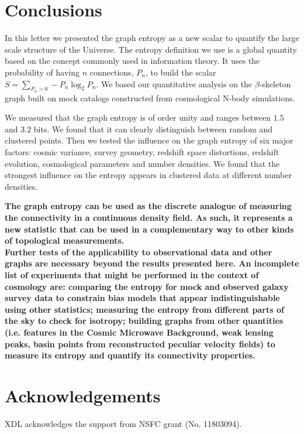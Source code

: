 \documentclass[fleqn,usenatbib]{mnras}
\begin{document}
\section{Conclusions}

In this letter we presented the graph entropy as a new scalar to 
quantify the large scale structure of the Universe.
The entropy definition we use is a global quantity based on 
the concept commonly used in information theory.
It uses the probability of having $n$ connections, $P_n$, to build the 
scalar $S=\sum_{P_n>0} -P_n  \log_2 P_n$. 
We based our quantitative analysis on the $\beta$-skeleton graph 
built on mock catalogs constructed from cosmological N-body simulations.

We measured that the graph entropy is of order unity and ranges 
between $1.5$ and $3.2$ bits.
We found that it can clearly distinguish between random and clustered points.
Then we tested the influence on the graph entropy of six major factors: 
cosmic variance, survey geometry, redshift space distortions, redshift evolution, cosmological parameters and number densities.
We found that the strongest influence on the entropy appears in
clustered data at different number densities.

\textbf{The graph entropy can be used as the discrete analogue
  of measuring the connectivity in a continuous density field.
  As such, it represents a new statistic that can be used in a complementary way to other kinds of topological measurements.\\
 \indent
 Further tests of the applicability to observational data and other graphs are necessary beyond the results presented here.
  An incomplete list of experiments that might be performed in the context of cosmology are:  comparing the entropy for mock and observed galaxy survey data to constrain bias models that appear indistinguishable using other statistics; measuring the entropy from different parts of the sky to check for isotropy; 
building graphs from  other quantities (i.e. features in the Cosmic Microwave Background, weak lensing peaks,
basin points from reconstructed peculiar velocity fields) to measure its entropy and quantify its connectivity properties.
}

\section*{Acknowledgements}
XDL acknowledges the support from NSFC grant (No. 11803094).




\end{document}
